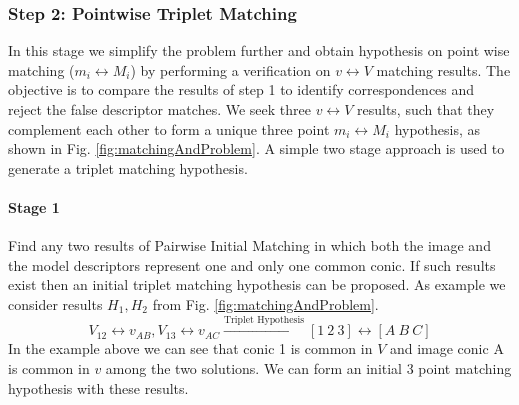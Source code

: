 \documentclass{bmvc2k}
\begin{document}
\subsubsection{Step 2: Pointwise Triplet Matching}
In this stage we simplify the problem further and obtain hypothesis on point wise matching ($ m_i \leftrightarrow M_i $) by performing a verification on $ v \leftrightarrow V $ matching results. 
The objective is to compare the results of step 1 to identify correspondences and reject the false descriptor matches. 
We seek three $ v \leftrightarrow V $ results, such that they complement each other to form a unique three point $ m_i \leftrightarrow M_i $ hypothesis, as shown in Fig. \ref{fig:matchingAndProblem}. 
A simple two stage approach is used to generate a triplet matching hypothesis. 
\paragraph{Stage 1} Find any two results of Pairwise Initial Matching in which both the image and the model descriptors represent one and only one common conic. If such results exist then an initial triplet matching hypothesis can be proposed. 
As example we consider results $ H_1 , H_2 $ from Fig. \ref{fig:matchingAndProblem}.
\[
 V_{12} \leftrightarrow v_{AB},V_{13} \leftrightarrow v_{AC } \xrightarrow{\text{Triplet Hypothesis}} [1~2~3] \leftrightarrow [A~B~ C]
\]
In the example above we can see that conic 1 is common in $ V $ and image conic A is common in $ v $ among the two solutions. We can form an initial 3 point matching hypothesis with these results. 
\end{document}
